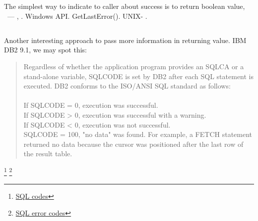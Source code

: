 ﻿\section{}

{The simplest way to indicate to caller about success is to return boolean value},
 ~--- ,
\AndENRU {} .
 Windows API.
 GetLastError(). 
 UNIX- .

\subsection{}

{Another interesting approach to pass more information in returning value}.
 IBM DB2 9.1, 
{we may spot this}:

\begin{framed}
\begin{quotation}
Regardless of whether the application program provides an SQLCA or a stand-alone variable, SQLCODE is set by DB2 after each SQL statement is executed. DB2 conforms to the ISO/ANSI SQL standard as follows:\\
\\
If SQLCODE = 0, execution was successful.\\
If SQLCODE > 0, execution was successful with a warning.\\
If SQLCODE < 0, execution was not successful.\\
SQLCODE = 100, "no data" was found. For example, a FETCH statement returned no data because the cursor was positioned after the last row of the result table.
\end{quotation}
\end{framed}
\footnote{\href{http://publib.boulder.ibm.com/infocenter/dzichelp/v2r2/index.jsp?topic=\%2Fcom.ibm.db2z9.doc.codes\%2Fsrc\%2Ftpc\%2Fdb2z\_sqlcodes.htm}{SQL codes}}
\footnote{\href{http://publib.boulder.ibm.com/infocenter/dzichelp/v2r2/index.jsp?topic=\%2Fcom.ibm.db2z9.doc.codes\%2Fsrc\%2Ftpc\%2Fdb2z\_n.htm}{SQL error codes}}

